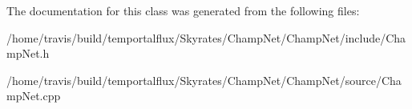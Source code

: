 The documentation for this class was generated from the following files\-:\begin{DoxyCompactItemize}
\item 
/home/travis/build/temportalflux/\-Skyrates/\-Champ\-Net/\-Champ\-Net/include/Champ\-Net.\-h\item 
/home/travis/build/temportalflux/\-Skyrates/\-Champ\-Net/\-Champ\-Net/source/Champ\-Net.\-cpp\end{DoxyCompactItemize}

